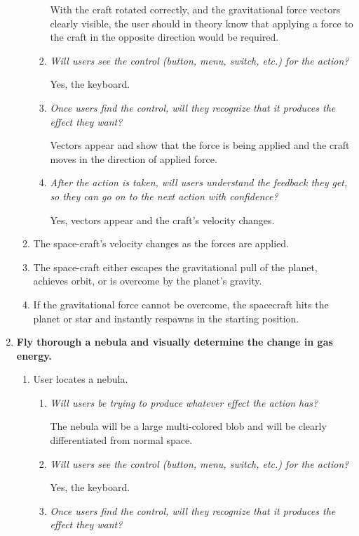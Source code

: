 \begin{enumerate}
\begin{enumerate}
\begin{enumerate}
    With the craft rotated correctly, and the gravitational force vectors clearly visible, the user should in theory know that applying a force to the craft in the opposite direction would be required.
    \item \emph{Will users see the control (button, menu, switch, etc.) for the action?}

    Yes, the keyboard.
    \item \emph{Once users find the control, will they recognize that it produces the effect they want?}

    Vectors appear and show that the force is being applied and the craft moves in the direction of applied force.
    \item \emph{After the action is taken, will users understand the feedback they get, so they can go on to the next action with confidence?}

    Yes, vectors appear and the craft's velocity changes.
  \end{enumerate}

  \item The space-craft's velocity changes as the forces are applied.

  \item The space-craft either escapes the gravitational pull of the planet, achieves orbit, or is overcome by the planet's gravity.

  \item If the gravitational force cannot be overcome, the spacecraft hits the planet or star and instantly respawns in the starting position.

\end{enumerate}

\item\textbf{Fly thorough a nebula and visually determine the change in gas energy.}
\begin{enumerate}

  \item User locates a nebula.
  \begin{enumerate}
    \item \emph{Will users be trying to produce whatever effect the action has?}

    The nebula will be a large multi-colored blob and will be clearly differentiated from normal space.
    \item \emph{Will users see the control (button, menu, switch, etc.) for the action?}

    Yes, the keyboard.
    \item \emph{Once users find the control, will they recognize that it produces the effect they want?}


\end{enumerate}
\end{enumerate}
\end{enumerate}

